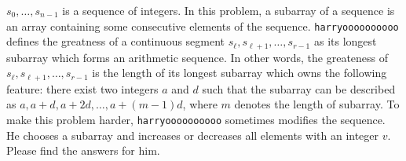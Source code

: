 $s_0,\dots,s_{n-1}$ is a sequence of integers. 
In this problem, a subarray of a sequence is an array containing some consecutive elements of the sequence. 
\texttt{harryoooooooooo} defines the greatness of a continuous segment $s_\ell,s_{\ell+1},\dots,s_{r-1}$
as its longest subarray which forms an arithmetic sequence.
In other words, the greateness of $s_\ell,s_{\ell+1},\dots,s_{r-1}$ is the length of its longest subarray
which owns the following feature: there exist two integers $a$ and $d$ such that 
the subarray can be described as $a, a+d, a+2d, \dots, a+(m-1)d$, where $m$ denotes the length of subarray. 
To make this problem harder, \texttt{harryoooooooooo} sometimes modifies the sequence. 
He chooses a subarray and increases or decreases all elements with an integer $v$. Please find the answers for him.

